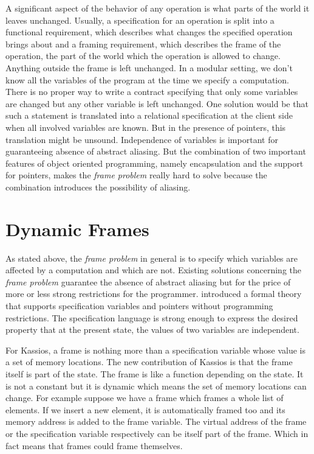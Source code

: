 A significant aspect of the behavior of any operation is what parts of the world it leaves unchanged. Usually, a specification for an operation is split into a functional requirement, which describes what changes the specified operation brings about and a framing requirement, which describes the frame of the operation, the part of the world which the operation is allowed to change. Anything outside the frame is left unchanged. In a modular setting, we don't know all the variables of the program at the time we specify a computation. There is no proper way to write a contract specifying that only some variables are changed but any other variable is left unchanged. One solution would be that such a statement is translated into a relational specification at the client side when all involved variables are known. But in the presence of pointers, this translation might be unsound. Independence of variables is important for guaranteeing absence of abstract aliasing. But the combination of two important features of object oriented programming, namely encapsulation and the support for pointers, makes the \emph{frame problem} really hard to solve because the combination introduces the possibility of aliasing.

\section{Dynamic Frames}
\label{sec:DynamicFrames}

As stated above, the \emph{frame problem} in general is to specify which variables are affected by a computation and which are not. Existing solutions concerning the \emph{frame problem} guarantee the absence of abstract aliasing but for the price of more or less strong restrictions for the programmer. \cite{Kassios06Dynamic} introduced a formal theory that supports specification variables and pointers without programming restrictions. The specification language is strong enough to express the desired property that at the present state, the values of two variables are independent.

For Kassios, a frame is nothing more than a specification variable whose value is a set of memory locations. The new contribution of Kassios is that the frame itself is part of the state. The frame is like a function depending on the state. It is not a constant but it is dynamic which means the set of memory locations can change. For example suppose we have a frame which frames a whole list of elements. If we insert a new element, it is automatically framed too and its memory address is added to the frame variable. The virtual address of the frame or the specification variable respectively can be itself part of the frame. Which in fact means that frames could frame themselves.

